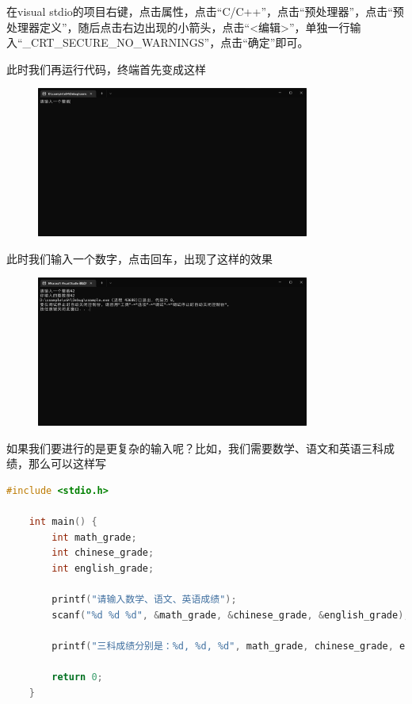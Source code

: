 在visual stdio的项目右键，点击属性，点击“C/C++”，点击“预处理器”，点击“预处理器定义”，随后点击右边出现的小箭头，点击“<编辑>”，单独一行输入“\_CRT\_SECURE\_NO\_WARNINGS”，点击“确定”即可。

此时我们再运行代码，终端首先变成这样

\begin{figure}[ht]
    \centering
    \includegraphics[width=0.8\textwidth, height=0.3\textheight]{images/1scanf首次.png}
\end{figure}

此时我们输入一个数字，点击回车，出现了这样的效果

\begin{figure}[ht]
    \centering
    \includegraphics[width=0.8\textwidth, height=0.3\textheight]{images/1scanf完成.png}
\end{figure}

如果我们要进行的是更复杂的输入呢？比如，我们需要数学、语文和英语三科成绩，那么可以这样写

\begin{lstlisting}[language=C]
    #include <stdio.h>

    int main() {
        int math_grade;
        int chinese_grade;
        int english_grade;

        printf("请输入数学、语文、英语成绩");
        scanf("%d %d %d", &math_grade, &chinese_grade, &english_grade);

        printf("三科成绩分别是：%d, %d, %d", math_grade, chinese_grade, english_grade);
        
        return 0;
    } 
\end{lstlisting}

